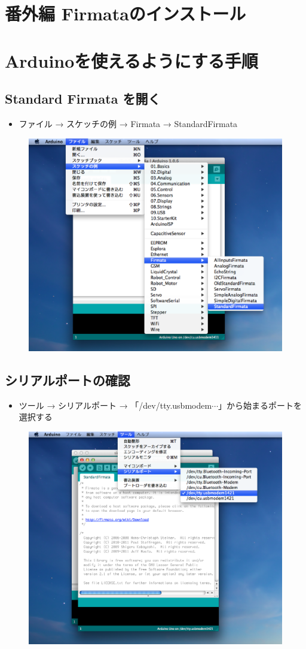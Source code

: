 \documentclass[11pt,a4paper]{jarticle}
\begin{document}
\section*{\LARGE{番外編 Firmataのインストール}}

\section{Arduinoを使えるようにする手順}
\subsection{Standard Firmata を開く}
\begin{itemize}
\item ファイル → スケッチの例 → Firmata → StandardFirmata
\end{itemize}

 \begin{figure}[h]
 \centering
 \includegraphics[width=0.63\columnwidth]{img/firmata3.eps}
\end{figure}

\subsection{シリアルポートの確認}
\begin{itemize}
\item ツール → シリアルポート → 「/dev/tty.usbmodem$\cdots$」から始まるポートを選択する
\end{itemize}

 \begin{figure}[h]
 \centering
 \includegraphics[width=0.63\columnwidth]{img/firmata5.eps}
\end{figure}
\end{document}
